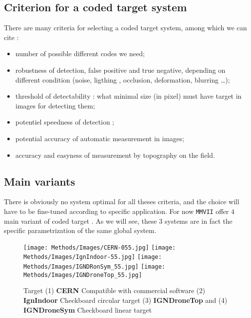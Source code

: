 
\subsection{Criterion for a coded target system}

There are many criteria for selecting a coded target system, among which we can cite :

\begin{itemize}
    \item number of possible different codes we need;

    \item robustness of detection, false positive and true negative,  depending on
	    different condition  (noise, ligthing , occlusion,  deformation, blurring \dots);

    \item threshold of detectability : what minimal size (in pixel) must have target in images
	    for detecting them;

    \item potentiel speedness of detection ;

    \item potential accuracy of automatic measurement in images;

    \item accuracy and easyness of measurement by topography on the field.

\end{itemize}



\subsection{Main variants}

There is obviously no system optimal for all theses criteria, and the choice will have to
be fine-tuned according to specific application.
For now {\tt MMVII} offer $4$ main variant of coded target . As we will see, these $3$ systems are in
fact the specific parametrization of the same global system.

\begin{figure}
\centering
   \texttt{[image: Methods/Images/CERN-055.jpg]}
   \texttt{[image: Methods/Images/IgnIndoor-55.jpg]}
   \texttt{[image: Methods/Images/IGNDRonSym\_55.jpg]}
   \texttt{[image: Methods/Images/IGNDroneTop\_55.jpg]}
    \caption{Target (1) {\bf CERN} Compatible with commercial software 
                    (2) {\bf IgnIndoor} Checkboard circular target 
		    (3) {\bf IGNDroneTop} and (4) {\bf IGNDroneSym} Checkboard linear target
            }
\label{fig:CodedTarget}
\end{figure}

